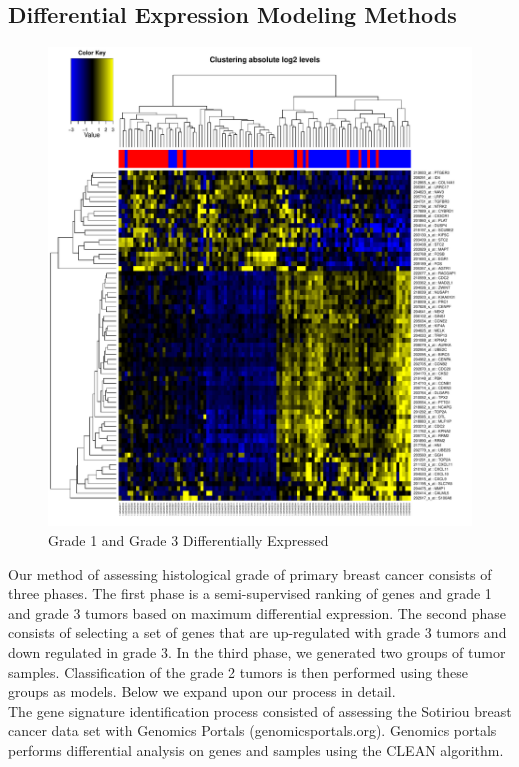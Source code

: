 \documentclass[a4paper,10pt]{article}
\begin{document}
\subsection{Differential Expression Modeling Methods}
\begin{figure}
\centering
\includegraphics[scale=0.43]{docs/grade1and3differentiallyexpressed}
\caption{Grade 1 and Grade 3 Differentially Expressed}\label{grade13diff}
\end{figure}
Our method of assessing histological grade of primary breast cancer consists of three phases. The first phase is
a semi-supervised ranking of genes and grade 1 and grade 3 tumors based on maximum differential
expression. The second phase consists of selecting a set of genes that are up-regulated with 
grade 3 tumors and down regulated in grade 3. In the third phase, we generated two groups of tumor samples.
Classification of the grade 2 tumors is then performed using these groups as models. Below we expand upon
our process in detail.\\
The gene signature identification process consisted of assessing the Sotiriou breast cancer data set with Genomics Portals (genomicsportals.org).
Genomics portals performs differential analysis on genes and samples using the CLEAN algorithm\cite{CLEAN}. 
\end{document}
